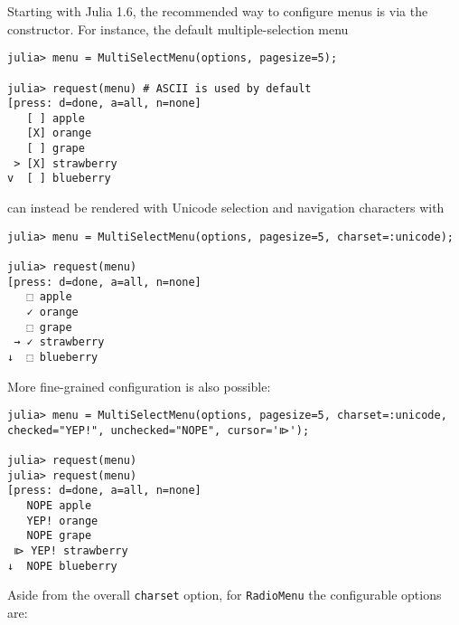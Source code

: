 Starting with Julia 1.6, the recommended way to configure menus is via the constructor. For instance, the default multiple-selection menu




\begin{lstlisting}
julia> menu = MultiSelectMenu(options, pagesize=5);

julia> request(menu) # ASCII is used by default
[press: d=done, a=all, n=none]
   [ ] apple
   [X] orange
   [ ] grape
 > [X] strawberry
v  [ ] blueberry
\end{lstlisting}



can instead be rendered with Unicode selection and navigation characters with




\begin{verbatim}
julia> menu = MultiSelectMenu(options, pagesize=5, charset=:unicode);

julia> request(menu)
[press: d=done, a=all, n=none]
   ⬚ apple
   ✓ orange
   ⬚ grape
 → ✓ strawberry
↓  ⬚ blueberry
\end{verbatim}



More fine-grained configuration is also possible:




\begin{verbatim}
julia> menu = MultiSelectMenu(options, pagesize=5, charset=:unicode, checked="YEP!", unchecked="NOPE", cursor='⧐');

julia> request(menu)
julia> request(menu)
[press: d=done, a=all, n=none]
   NOPE apple
   YEP! orange
   NOPE grape
 ⧐ YEP! strawberry
↓  NOPE blueberry
\end{verbatim}



Aside from the overall \texttt{charset} option, for \texttt{RadioMenu} the configurable options are:



